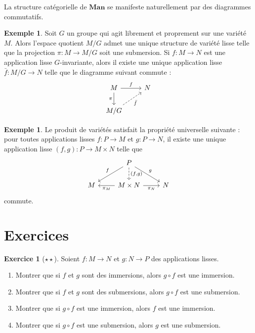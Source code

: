 \documentclass[12pt,a4paper,openany]{book}
\theoremstyle{definition}
\newtheorem{exemple}[definition]{Exemple}
\newtheorem{exercice}{Exercice}[chapter]
\theoremstyle{plain}
\theoremstyle{remark}
\begin{document}
La structure catégorielle de $\mathbf{Man}$ se manifeste naturellement par des
diagrammes commutatifs.

\begin{exemple}\label{ex:diagramme-quotient}
Soit $G$ un groupe qui agit librement et proprement sur une variété $M$.
Alors l'espace quotient $M/G$ admet une unique structure de variété lisse
telle que la projection $\pi \colon M \to M/G$ soit une submersion. Si $f
\colon M \to N$ est une application lisse $G$-invariante, alors il existe une
unique application lisse $\bar{f} \colon M/G \to N$ telle que le diagramme
suivant commute :
\[
\begin{tikzcd}
    M \arrow[r, "f"] \arrow[d, "\pi"'] & N \\
    M/G \arrow[ur, "\bar{f}"', dashed]
\end{tikzcd}
\]
\end{exemple}

\begin{exemple}\label{ex:diagramme-produit}
Le produit de variétés satisfait la propriété universelle suivante : pour
toutes applications lisses $f \colon P \to M$ et $g \colon P \to N$, il existe
une unique application lisse $(f, g) \colon P \to M \times N$ telle que
\[
\begin{tikzcd}
    & P \arrow[dl, "f"'] \arrow[dr, "g"] \arrow[d, dashed, "{(f,g)}"] & \\
    M & M \times N \arrow[l, "\pi_M"] \arrow[r, "\pi_N"'] & N
\end{tikzcd}
\]
commute.
\end{exemple}


\section{Exercices}
\label{sec:exercices-ch2}

\begin{exercice}[$\star\star$]\label{exo:composition-immersions}
Soient $f \colon M \to N$ et $g \colon N \to P$ des applications lisses.
\begin{enumerate}[label=(\alph*)]
    \item Montrer que si $f$ et $g$ sont des immersions, alors $g \circ f$ est
    une immersion.
    \item Montrer que si $f$ et $g$ sont des submersions, alors $g \circ f$ est
    une submersion.
    \item Montrer que si $g \circ f$ est une immersion, alors $f$ est une
    immersion.
    \item Montrer que si $g \circ f$ est une submersion, alors $g$ est une
    submersion.
\end{enumerate}
\end{exercice}
\end{document}
